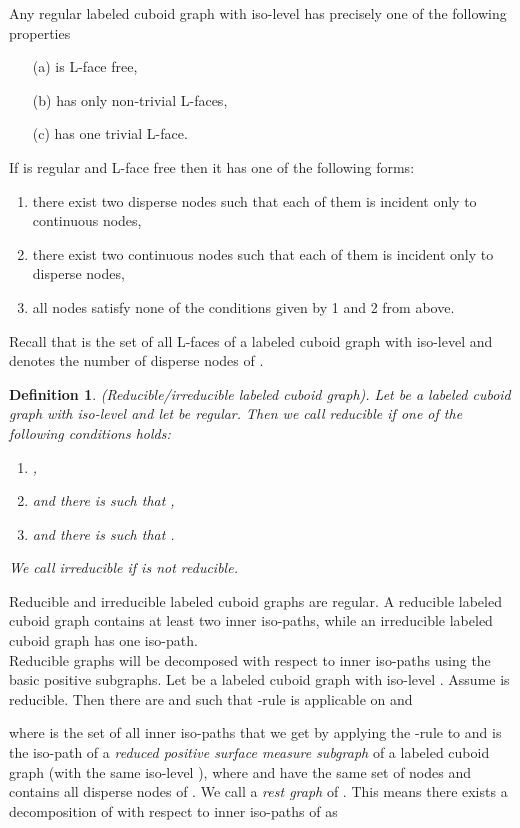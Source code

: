 \documentclass[a4paper,11pt]{article}
\newtheorem{definition}[theorem]{Definition}
\begin{document}
Any regular labeled cuboid graph  with iso-level  has precisely
one of the following properties
\begin{enumerate}
\item[(a)]  is L-face free,
\item[(b)]  has only non-trivial L-faces,
\item[(c)]  has one trivial L-face.
\end{enumerate}
If  is regular and L-face free then it has one of the following forms:
\begin{enumerate}
\item there exist two disperse nodes such that each of them is incident only to continuous nodes,
\item there exist two continuous nodes such that each of them is incident only to disperse nodes,
\item all nodes satisfy none of the conditions given by 1 and 2 from above.
\end{enumerate}

\noindent Recall that  is the set of all L-faces of a labeled cuboid graph  with iso-level
 and  denotes the number of disperse nodes of .
\begin{definition}(Reducible/irreducible labeled cuboid graph). Let  be a labeled
cuboid graph with iso-level  and let  be regular. Then we call  reducible if one of
the following conditions holds:
\begin{enumerate}
\item ,
\item  and there is  such that ,
\item  and there is  such that .
\end{enumerate}
We call  irreducible if  is not reducible.
\label{def:class-1}
\end{definition}
Reducible and irreducible labeled cuboid graphs are regular. A reducible
labeled cuboid graph contains at least two inner iso-paths, while an irreducible labeled cuboid graph
has one iso-path.\\

Reducible graphs will be decomposed with respect to inner iso-paths using the basic positive subgraphs.
Let  be a labeled cuboid graph with iso-level . Assume  is reducible.
Then there are   and  such that -rule is applicable on  and

where  is the set of all inner iso-paths that we get by applying the -rule to  and 
is the iso-path of a {\it reduced positive surface measure subgraph} 
of a labeled cuboid graph  (with the same iso-level ), where  and 
have the same set of nodes and  contains all disperse nodes of . We call  a {\it rest graph}
of . This means there exists a decomposition  of  with respect to inner iso-paths of  as
\end{document}
